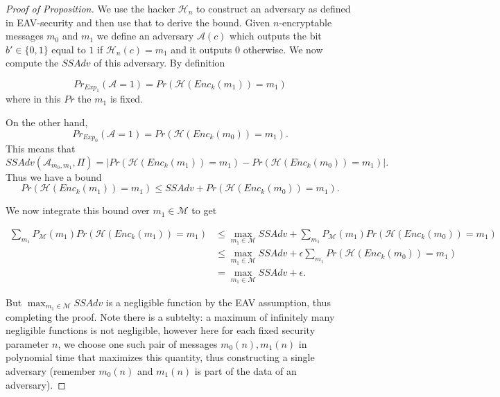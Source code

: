 \documentclass[twoside, a4paper, 10pt]{amsart}
\begin{document}
\begin{proof}[Proof of Proposition] We use the hacker $\mathcal{H}_n$ to construct an adversary as defined in EAV-security and then use that to derive the bound. Given $n$-encryptable messages $m_0$ and $m_1$ we define an adversary $\mathcal{A}(c)$ which outputs the bit $b' \in \{0,1\}$ equal to $1$ if $\mathcal{H}_n(c) = m_1$ and it outputs $0$ otherwise. We now compute the $SSAdv$ of this adversary. By definition

$$Pr_{Exp_1} (\mathcal{A} = 1) =  Pr(\mathcal{H} (Enc_k(m_1)) = m_1)$$ where in this $Pr$ the $m_1$ is fixed.

On the other hand, $$Pr_{Exp_0} (\mathcal{A} = 1) = Pr(\mathcal{H} (Enc_k(m_0)) = m_1).$$ This means that $$SSAdv(\mathcal{A}_{m_0, m_1}, \Pi) = \left| Pr(\mathcal{H} (Enc_k(m_1)) = m_1) - Pr(\mathcal{H} (Enc_k(m_0)) = m_1) \right|.$$ Thus we have a bound $$Pr(\mathcal{H} (Enc_k(m_1)) = m_1) \leq SSAdv + Pr(\mathcal{H} (Enc_k(m_0)) = m_1). $$

We now integrate this bound over $m_1 \in \mathcal{M}$ to get

\begin{align*} \sum_{m_1} P_{\mathcal{M}} (m_1) Pr(\mathcal{H} (Enc_k(m_1)) = m_1)  & \leq \max_{m_1 \in \mathcal{M}} SSAdv + \sum_{m_1} P_{\mathcal{M}} (m_1) Pr(\mathcal{H} (Enc_k(m_0)) = m_1)   \\ & \leq \max_{m_1 \in \mathcal{M}} SSAdv + \epsilon \sum_{m_1} Pr(\mathcal{H} (Enc_k(m_0)) = m_1)  \\ & =  \max_{m_1 \in \mathcal{M}} SSAdv + \epsilon.   \end{align*}

But  $\max_{m_1 \in \mathcal{M}} SSAdv$ is a negligible function by the EAV assumption, thus completing the proof. Note there is a subtelty: a maximum of infinitely many negligible functions is not negligible, however here for each fixed security parameter $n$, we choose one such pair of messages $m_0(n), m_1(n)$ in polynomial time that maximizes this quantity, thus constructing a single adversary (remember $m_0(n)$ and $m_1(n)$ is part of the data of an adversary). 
\end{proof}
\end{document}

